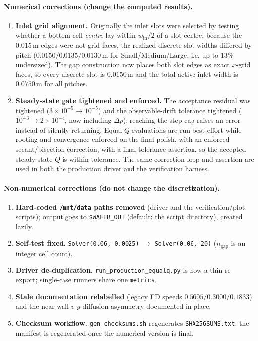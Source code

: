 \documentclass[11pt]{article}
\begin{document}
\paragraph{Numerical corrections (change the computed results).}
\begin{enumerate}\itemsep2pt
\item \textbf{Inlet grid alignment.} Originally the inlet slots were selected by
testing whether a bottom cell \emph{centre} lay within $w_\mathrm{in}/2$ of a
slot centre; because the $0.015\,$m edges were not grid faces, the realized
discrete slot widths differed by pitch ($0.0150/0.0135/0.0130\,$m for
Small/Medium/Large, i.e. up to $13\%$ undersized). The gap construction now
places both slot edges as exact $x$-grid faces, so every discrete slot is
$0.0150\,$m and the total active inlet width is $0.0750\,$m for all pitches.
\item \textbf{Steady-state gate tightened and enforced.} The acceptance residual
was tightened ($3\times10^{-5}\!\to\!10^{-5}$) and the observable-drift tolerance
tightened ($10^{-3}\!\to\!2\times10^{-4}$, now including $\Delta p$); reaching the
step cap raises an error instead of silently returning. Equal-$Q$ evaluations are
run best-effort while rooting and convergence-enforced on the final polish, with
an enforced secant/bisection correction, with a final tolerance assertion, so
the accepted steady-state $Q$ is within tolerance. The same correction loop and
assertion are used in both the production driver and the verification harness.
\end{enumerate}

\paragraph{Non-numerical corrections (do not change the discretization).}
\begin{enumerate}\itemsep2pt
\item \textbf{Hard-coded \texttt{/mnt/data} paths removed} (driver and the
verification/plot scripts); output goes to \texttt{\$WAFER\_OUT} (default: the
script directory), created lazily.
\item \textbf{Self-test fixed.} \texttt{Solver(0.06, 0.0025)} $\to$
\texttt{Solver(0.06, 20)} ($n_\mathrm{gap}$ is an integer cell count).
\item \textbf{Driver de-duplication.} \texttt{run\_production\_equalq.py} is now
a thin re-export; single-case runners share one \texttt{metrics}.
\item \textbf{Stale documentation relabelled} (legacy FD speeds
$0.5605/0.3000/0.1833$) and the near-wall $v$ $y$-diffusion asymmetry documented
in place.
\item \textbf{Checksum workflow.} \texttt{gen\_checksums.sh} regenerates
\texttt{SHA256SUMS.txt}; the manifest is regenerated once the numerical version
is final.
\end{enumerate}
\end{document}
